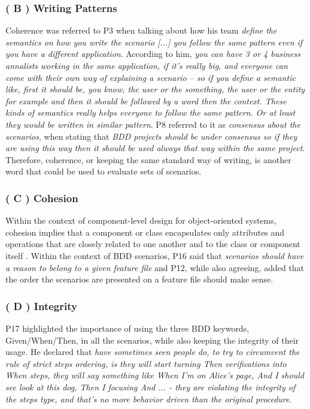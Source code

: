 \subsubsection{\textbf{( B ) Writing Patterns}}
Coherence was referred to P3 when talking about how his team \textit{define the semantics on how you write the scenario [...] you follow the same pattern even if you have a different application}. According to him, \textit{you can have 3 or 4 business annalists working in the same application, if it's really big, and everyone can come with their own way of explaining a scenario -- so if you define a semantic like, first it should be, you know, the user or the something, the user or the entity for example and then it should be followed by a word then the context. These kinds of semantics really helps everyone to follow the same pattern. Or at least they would be written in similar pattern}. P8 referred to it as \textit{consensus about the scenarios}, when stating that \textit{BDD projects should be under consensus so if they are using this way then it should be used always that way within the same project}. Therefore, coherence, or keeping the same standard way of writing, is another word that could be used to evaluate sets of scenarios.

\subsubsection{\textbf{( C ) Cohesion}}
Within the context of component-level design for object-oriented systems, cohesion implies that a component or class encapsulates only attributes and operations that are closely related to one another and to the class or component itself \cite{Pressman_2009}. Within the context of BDD scenarios, P16 said that \textit{scenarios should have a reason to belong to a given feature file} and P12, while also agreeing, added that the order the scenarios are presented on a feature file should make sense.

\subsubsection{\textbf{( D ) Integrity}}
P17 highlighted the importance of using the three BDD keywords, Given/When/Then, in all the scenarios, while also keeping the integrity of their usage. He declared that \textit{have sometimes seen people do, to try to circumvent the rule of strict steps ordering, is they will start turning Then verifications into When steps, they will say something like \textit{When I'm on Alice's page, And I should see look at this dog, Then I focusing And ...} - they are violating the integrity of the steps type, and that's no more behavior driven than the original procedure}. 

